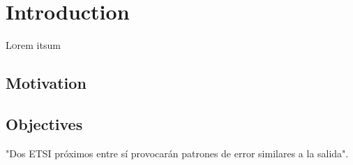 \chapter{Introduction}
\label{ch:Introduction}
\lettrine[lraise=-0.1, lines=2, loversize=0.2]{L}{o}rem itsum





\section{Motivation}
\label{sec:Motivation}

\section{Objectives}
\label{sec:Objectives}

\begin{hypothesis}\label{hyp:inicial}
    "Dos \gls{ETSI} próximos entre sí provocarán patrones de error similares a la 
    salida".
\end{hypothesis}

\endinput
